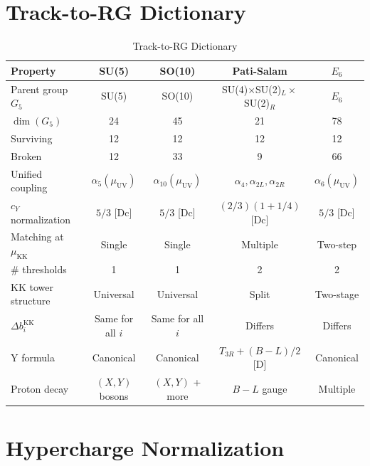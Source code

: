 \documentclass[11pt,a4paper]{article}
\begin{document}
\section{Track-to-RG Dictionary}
\label{sec:track-rg}

\begin{table}[h]
\centering
\caption{Track-to-RG Dictionary}
\label{tab:track-rg}
\begin{tabular}{lcccc}
\toprule
Property & SU(5) & SO(10) & Pati-Salam & $E_6$ \\
\midrule
Parent group $G_5$ & SU(5) & SO(10) & SU(4)$\times$SU(2)$_L\times$SU(2)$_R$ & $E_6$ \\
$\dim(G_5)$ & 24 & 45 & 21 & 78 \\
Surviving & 12 & 12 & 12 & 12 \\
Broken & 12 & 33 & 9 & 66 \\
\midrule
Unified coupling & $\alpha_5(\mu_{\text{UV}})$ & $\alpha_{10}(\mu_{\text{UV}})$ & $\alpha_4, \alpha_{2L}, \alpha_{2R}$ & $\alpha_6(\mu_{\text{UV}})$ \\
$c_Y$ normalization & $5/3$ [Dc] & $5/3$ [Dc] & $(2/3)(1 + 1/4)$ [Dc] & $5/3$ [Dc] \\
\midrule
Matching at $\mu_{\text{KK}}$ & Single & Single & Multiple & Two-step \\
\# thresholds & 1 & 1 & 2 & 2 \\
\midrule
KK tower structure & Universal & Universal & Split & Two-stage \\
$\Delta b_i^{\text{KK}}$ & Same for all $i$ & Same for all $i$ & Differs & Differs \\
\midrule
Y formula & Canonical & Canonical & $T_{3R} + (B-L)/2$ [D] & Canonical \\
Proton decay & $(X,Y)$ bosons & $(X,Y)$ + more & $B-L$ gauge & Multiple \\
\bottomrule
\end{tabular}
\end{table}

\section{Hypercharge Normalization}
\label{sec:hypercharge}
\end{document}
